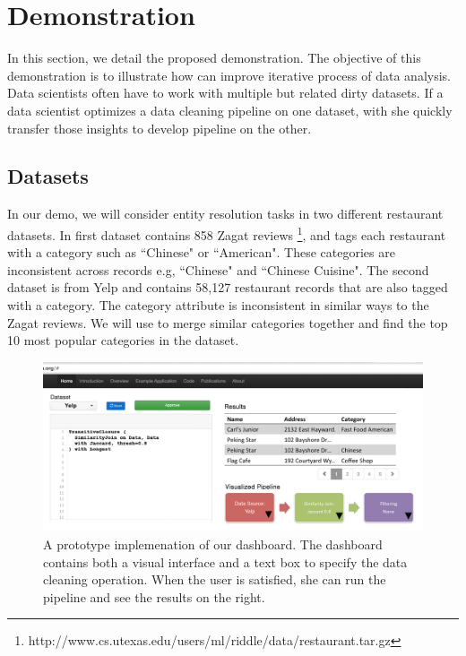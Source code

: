 \section{Demonstration}
In this section, we detail the proposed demonstration.
The objective of this demonstration is to illustrate 
how \sys can improve iterative process of data analysis.
Data scientists often have to work with multiple but related dirty datasets.
If a data scientist optimizes a data cleaning pipeline on one dataset, with \sys 
she quickly transfer those insights to develop pipeline on the other.

\subsection{Datasets}
In our demo, we will consider entity resolution tasks in two different restaurant datasets.
In first dataset contains 858 Zagat reviews \footnote{http://www.cs.utexas.edu/users/ml/riddle/data/restaurant.tar.gz},
and tags each restaurant with a category such as ``Chinese" or ``American".
These categories are inconsistent across records e.g, ``Chinese" and ``Chinese Cuisine".
The second dataset is from Yelp and contains 58,127 restaurant records that are also tagged with a category.
The category attribute is inconsistent in similar ways to the Zagat reviews.
We will use \sys to merge similar categories together and find the top 10 most popular categories in the dataset.

\begin{figure}[t]
\centering
 \includegraphics[width=\columnwidth]{figs/dashboard_screenshot.png}
 \caption{A prototype implemenation of our \sys dashboard. The dashboard contains both a visual interface and a text box to specify the data cleaning operation. When the user is satisfied, she can run the pipeline and see the results on the right. \label{screenshot}}\vspace{-1.75em}
\end{figure}

